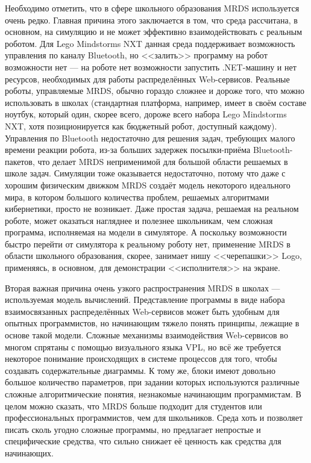\documentclass[a4paper]{article}
\begin{document}
Необходимо отметить, что в сфере школьного образования MRDS используется очень редко. Главная причина этого заключается в том, что среда рассчитана, в основном, на симуляцию и не может эффективно взаимодействовать с реальным роботом. Для Lego Mindstorms NXT данная среда поддерживает возможность управления по каналу Bluetooth, но <<залить>> программу на робот возможности нет --- на роботе нет возможности запустить .NET-машину и нет ресурсов, необходимых для работы распределённых Web-сервисов. Реальные роботы, управляемые MRDS, обычно гораздо сложнее и дороже того, что можно использовать в школах (стандартная платформа, например, имеет в своём составе ноутбук, который один, скорее всего, дороже всего набора Lego Mindstorms NXT, хотя позиционируется как бюджетный робот, доступный каждому). Управления по Bluetooth недостаточно для решения задач, требующих малого времени реакции робота, из-за больших задержек посылки-приёма Bluetooth-пакетов, что делает MRDS неприменимой для большой области решаемых в школе задач. Симуляции тоже оказывается недостаточно, потому что даже с хорошим физическим движком MRDS создаёт модель некоторого идеального мира, в котором большого количества проблем, решаемых алгоритмами кибернетики, просто не возникает. Даже простая задача, решаемая на реальном роботе, может оказаться нагляднее и полезнее школьникам, чем сложная программа, исполняемая на модели в симуляторе. А поскольку возможности быстро перейти от симулятора к реальному роботу нет, применение MRDS в области школьного образования, скорее, занимает нишу <<черепашки>> Logo, применяясь, в основном, для демонстрации <<исполнителя>> на экране.

Вторая важная причина очень узкого распространения MRDS в школах --- используемая модель вычислений. Представление программы в виде набора взаимосвязанных распределённых Web-сервисов может быть удобным для опытных программистов, но начинающим тяжело понять принципы, лежащие в основе такой модели. Сложные механизмы взаимодействия Web-сервисов во многом спрятаны с помощью визуального языка VPL, но всё же требуется некоторое понимание происходящих в системе процессов для того, чтобы создавать содержательные диаграммы. К тому же, блоки имеют довольно большое количество параметров, при задании которых используются различные сложные алгоритмические понятия, незнакомые начинающим программистам. В целом можно сказать, что MRDS больше подходит для студентов или профессиональных программистов, чем для школьников. Среда хоть и позволяет писать сколь угодно сложные программы, но предлагает непростые и специфические средства, что сильно снижает её ценность как средства для начинающих.
\end{document}
